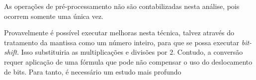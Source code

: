 	As operações de pré-processamento não são contabilizadas nesta análise, pois ocorrem somente uma
	única vez.

	Provavelmente é possível executar melhoras nesta técnica, talvez através do tratamento da mantissa
	como um número inteiro, para que se possa executar \textit{bit-shift}. Isso substituiria as multiplicações e
	divisões por $2$. Contudo, a conversão requer aplicação de uma fórmula que pode não compensar o uso do deslocamento de bits.
	Para tanto, é necessário um estudo mais profundo


